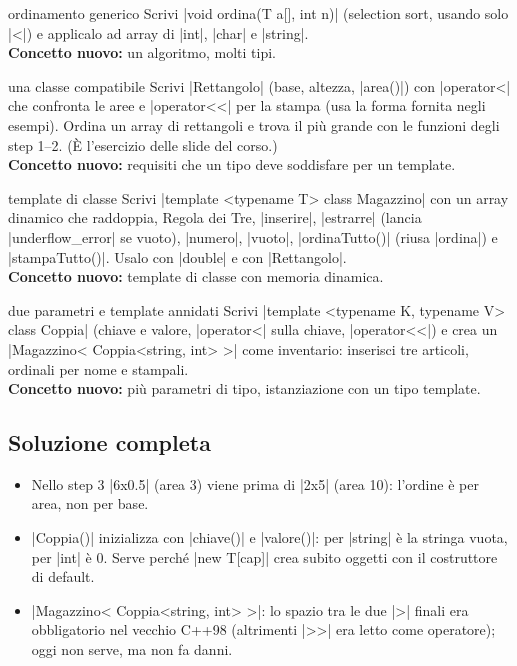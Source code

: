 \begin{step}{ordinamento generico}
Scrivi \cc|void ordina(T a[], int n)| (selection sort, usando solo \cc|<|) e
applicalo ad array di \cc|int|, \cc|char| e \cc|string|.\\[0.3em]
\textbf{Concetto nuovo:} un algoritmo, molti tipi.
\end{step}

\begin{step}{una classe compatibile}
Scrivi \cc|Rettangolo| (base, altezza, \cc|area()|) con \cc|operator<| che confronta
le aree e \cc|operator<<| per la stampa (usa la forma fornita negli esempi). Ordina
un array di rettangoli e trova il più grande con le funzioni degli step 1--2.
(È l'esercizio delle slide del corso.)\\[0.3em]
\textbf{Concetto nuovo:} requisiti che un tipo deve soddisfare per un template.
\end{step}

\begin{step}{template di classe}
Scrivi \cc|template <typename T> class Magazzino| con un array dinamico che
raddoppia, Regola dei Tre, \cc|inserire|, \cc|estrarre| (lancia
\cc|underflow_error| se vuoto), \cc|numero|, \cc|vuoto|, \cc|ordinaTutto()| (riusa
\cc|ordina|) e \cc|stampaTutto()|. Usalo con \cc|double| e con \cc|Rettangolo|.\\[0.3em]
\textbf{Concetto nuovo:} template di classe con memoria dinamica.
\end{step}

\begin{step}{due parametri e template annidati}
Scrivi \cc|template <typename K, typename V> class Coppia| (chiave e valore,
\cc|operator<| sulla chiave, \cc|operator<<|) e crea un
\cc|Magazzino< Coppia<string, int> >| come inventario: inserisci tre articoli,
ordinali per nome e stampali.\\[0.3em]
\textbf{Concetto nuovo:} più parametri di tipo, istanziazione con un tipo template.
\end{step}

\subsection*{Soluzione completa}

\begin{consiglio}
\begin{itemize}
  \item Nello step 3 \cc|6x0.5| (area 3) viene prima di \cc|2x5| (area 10): l'ordine
        è per area, non per base.
  \item \cc|Coppia()| inizializza con \cc|chiave()| e \cc|valore()|: per \cc|string|
        è la stringa vuota, per \cc|int| è 0. Serve perché \cc|new T[cap]| crea
        subito oggetti con il costruttore di default.
  \item \cc|Magazzino< Coppia<string, int> >|: lo spazio tra le due \cc|>| finali
        era obbligatorio nel vecchio C++98 (altrimenti \cc|>>| era letto come
        operatore); oggi non serve, ma non fa danni.
\end{itemize}
\end{consiglio}

